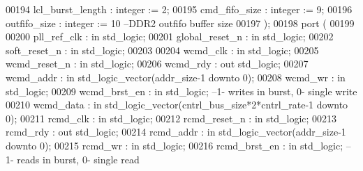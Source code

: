\begin{DoxyCode}
00194             lcl_burst_length    : \textcolor{comment}{integer} := \textcolor{vhdllogic}{}\textcolor{vhdllogic}{2};
00195             cmd_fifo_size       : \textcolor{comment}{integer} := \textcolor{vhdllogic}{}\textcolor{vhdllogic}{9};
00196             outfifo_size        : \textcolor{comment}{integer} := \textcolor{vhdllogic}{}\textcolor{vhdllogic}{10}\textcolor{keyword}{  --DDR2 outfifo buffer size}
00197         );
00198         \textcolor{keywordflow}{port} (
00199 
00200       pll_ref_clk       : \textcolor{keywordflow}{in} \textcolor{comment}{std\_logic};
00201       global_reset_n    : \textcolor{keywordflow}{in} \textcolor{comment}{std\_logic};
00202         soft_reset_n        : \textcolor{keywordflow}{in} \textcolor{comment}{std\_logic};
00203 
00204         wcmd_clk                : \textcolor{keywordflow}{in} \textcolor{comment}{std\_logic};
00205         wcmd_reset_n        : \textcolor{keywordflow}{in}  \textcolor{comment}{std\_logic};
00206         wcmd_rdy                : \textcolor{keywordflow}{out} \textcolor{comment}{std\_logic};
00207         wcmd_addr           : \textcolor{keywordflow}{in} \textcolor{comment}{std\_logic\_vector}(addr_size\textcolor{vhdlchar}{-}\textcolor{vhdllogic}{}\textcolor{vhdllogic}{1} \textcolor{keywordflow}{downto} \textcolor{vhdllogic}{}\textcolor{vhdllogic}{0});
00208         wcmd_wr             : \textcolor{keywordflow}{in} \textcolor{comment}{std\_logic};
00209         wcmd_brst_en        : \textcolor{keywordflow}{in} \textcolor{comment}{std\_logic}; \textcolor{keyword}{--1- writes in burst, 0- single write}
00210         wcmd_data           : \textcolor{keywordflow}{in} \textcolor{comment}{std\_logic\_vector}(cntrl_bus_size*\textcolor{vhdllogic}{}\textcolor{vhdllogic}{2}*cntrl_rate\textcolor{vhdlchar}{-}\textcolor{vhdllogic}{}\textcolor{vhdllogic}{1} \textcolor{keywordflow}{downto} \textcolor{vhdllogic}{}\textcolor{vhdllogic}{0});
00211         rcmd_clk                : \textcolor{keywordflow}{in} \textcolor{comment}{std\_logic};
00212         rcmd_reset_n        : \textcolor{keywordflow}{in}  \textcolor{comment}{std\_logic};
00213         rcmd_rdy                : \textcolor{keywordflow}{out} \textcolor{comment}{std\_logic};
00214         rcmd_addr           : \textcolor{keywordflow}{in} \textcolor{comment}{std\_logic\_vector}(addr_size\textcolor{vhdlchar}{-}\textcolor{vhdllogic}{}\textcolor{vhdllogic}{1} \textcolor{keywordflow}{downto} \textcolor{vhdllogic}{}\textcolor{vhdllogic}{0});
00215         rcmd_wr             : \textcolor{keywordflow}{in} \textcolor{comment}{std\_logic};
00216         rcmd_brst_en        : \textcolor{keywordflow}{in} \textcolor{comment}{std\_logic}; \textcolor{keyword}{--1- reads in burst, 0- single read}

\end{DoxyCode}
